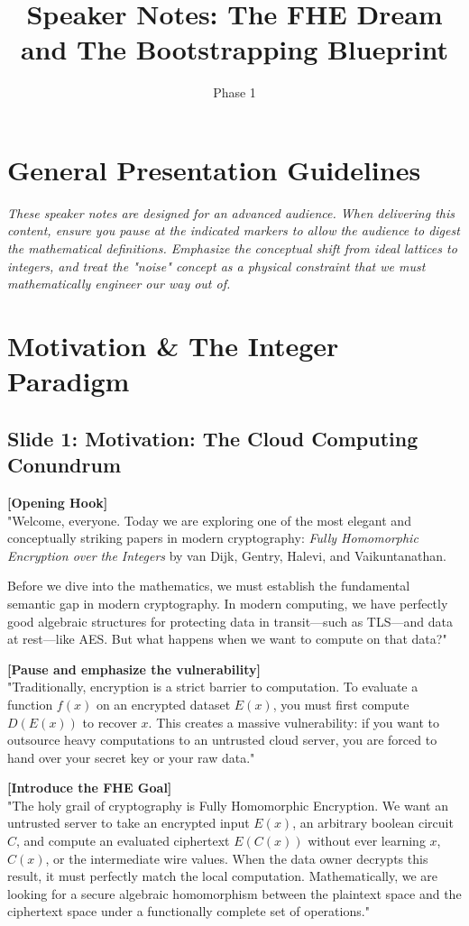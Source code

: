 \documentclass[11pt]{article}
\title{Speaker Notes: The FHE Dream and The Bootstrapping Blueprint}
\author{Phase 1}
\date{}
\begin{document}
\maketitle

\section*{General Presentation Guidelines}
\textit{These speaker notes are designed for an advanced audience. When delivering this content, ensure you pause at the indicated markers to allow the audience to digest the mathematical definitions. Emphasize the conceptual shift from ideal lattices to integers, and treat the "noise" concept as a physical constraint that we must mathematically engineer our way out of.}

\hrulefill

\section{Motivation \& The Integer Paradigm}

\subsection*{Slide 1: Motivation: The Cloud Computing Conundrum}
\textbf{[Opening Hook]} \\
"Welcome, everyone. Today we are exploring one of the most elegant and conceptually striking papers in modern cryptography: \textit{Fully Homomorphic Encryption over the Integers} by van Dijk, Gentry, Halevi, and Vaikuntanathan.

Before we dive into the mathematics, we must establish the fundamental semantic gap in modern cryptography. In modern computing, we have perfectly good algebraic structures for protecting data in transit---such as TLS---and data at rest---like AES. But what happens when we want to compute on that data?"

\textbf{[Pause and emphasize the vulnerability]} \\
"Traditionally, encryption is a strict barrier to computation. To evaluate a function $f(x)$ on an encrypted dataset $E(x)$, you must first compute $D(E(x))$ to recover $x$. This creates a massive vulnerability: if you want to outsource heavy computations to an untrusted cloud server, you are forced to hand over your secret key or your raw data."

\textbf{[Introduce the FHE Goal]} \\
"The holy grail of cryptography is Fully Homomorphic Encryption. We want an untrusted server to take an encrypted input $E(x)$, an arbitrary boolean circuit $C$, and compute an evaluated ciphertext $E(C(x))$ without ever learning $x$, $C(x)$, or the intermediate wire values. When the data owner decrypts this result, it must perfectly match the local computation. Mathematically, we are looking for a secure algebraic homomorphism between the plaintext space and the ciphertext space under a functionally complete set of operations."
\end{document}
